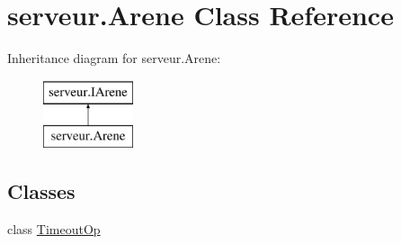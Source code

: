 \hypertarget{classserveur_1_1_arene}{\section{serveur.\-Arene Class Reference}
\label{classserveur_1_1_arene}
}
Inheritance diagram for serveur.\-Arene\-:\begin{figure}[H]
\begin{center}
\leavevmode
\includegraphics[height=2.000000cm]{classserveur_1_1_arene}
\end{center}
\end{figure}
\subsection*{Classes}
\begin{DoxyCompactItemize}
\item 
class \hyperlink{classserveur_1_1_arene_1_1_timeout_op}{Timeout\-Op}
\end{DoxyCompactItemize}
